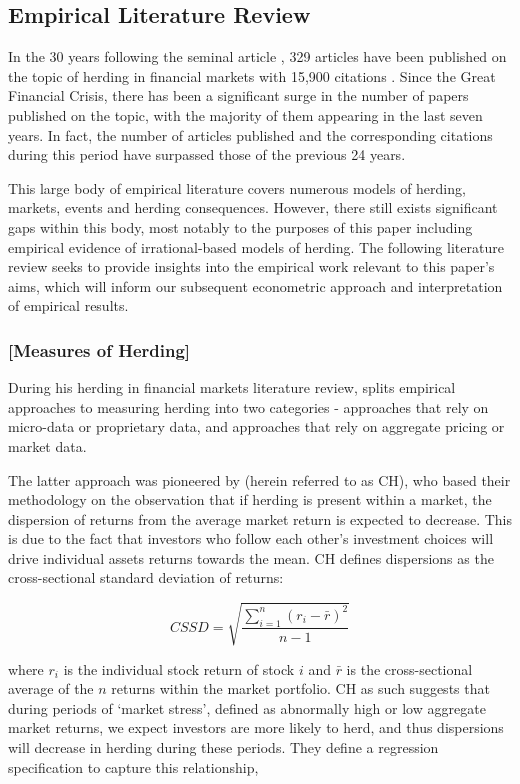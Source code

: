 \documentclass[12pt]{article}
\numberwithin{table}{section}   %
\begin{document}
\subsection{Empirical Literature Review}

In the 30 years following the seminal article \citet{scharfstein}, 329 articles have been published on the topic of herding in financial markets with 15,900 citations \citep{choijil}. Since the Great Financial Crisis, there has been a significant surge in the number of papers published on the topic, with the majority of them appearing in the last seven years. In fact, the number of articles published and the corresponding citations during this period have surpassed those of the previous 24 years.

This large body of empirical literature covers numerous models of herding, markets, events and herding consequences. However, there still exists significant gaps within this body, most notably to the purposes of this paper including empirical evidence of irrational-based models of herding. The following literature review seeks to provide insights into the empirical work relevant to this paper’s aims, which will inform our subsequent econometric approach and interpretation of empirical results.

\subsubsection*{[Measures of Herding]} 

During his herding in financial markets literature review, \citet{spyrou} splits empirical approaches to measuring herding into two categories - approaches that rely on micro-data or proprietary data, and approaches that rely on aggregate pricing or market data.

The latter approach was pioneered by \citet{ch} (herein referred to as CH), who based their methodology on the observation that if herding is present within a market, the dispersion of returns from the average market return is expected to decrease. This is due to the fact that investors who follow each other’s investment choices will drive individual assets returns towards the mean. CH defines dispersions as the cross-sectional standard deviation of returns:

$$
CSSD=\sqrt{\frac{\sum^n_{i=1}{(r_i-\bar{r})^2}}{n-1}}
$$

where $r_i$ is the individual stock return of stock $i$ and $\bar{r}$ is the cross-sectional average of the $n$ returns within the market portfolio. CH as such suggests that during periods of ‘market stress’, defined as abnormally high or low aggregate market returns, we expect investors are more likely to herd, and thus dispersions will decrease in herding during these periods. They define a regression specification to capture this relationship, 
\end{document}
